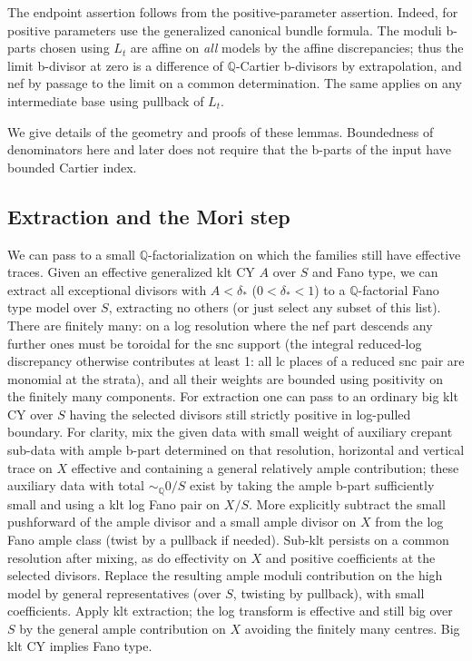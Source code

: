 The endpoint assertion follows from the positive-parameter assertion.
Indeed, for positive parameters use the generalized canonical bundle formula.
The moduli b-parts chosen using \(L_t\) are affine on \emph{all} models by the affine discrepancies; thus the limit b-divisor at zero is a difference of \(\mathbb Q\)-Cartier b-divisors by extrapolation, and nef by passage to the limit on a common determination.
The same applies on any intermediate base using pullback of \(L_t\).

We give details of the geometry and proofs of these lemmas.
Boundedness of denominators here and later does not require that the b-parts of the input have bounded Cartier index.

\subsection{Extraction and the Mori step}\label{subsec:A-mori}
We can pass to a small \(\mathbb Q\)-factorialization on which the
families still have effective traces.
Given an effective generalized klt CY \(A\) over \(S\) and Fano type, we can extract all exceptional divisors with \(A<\delta_*\) (\(0<\delta_*<1\)) to a \(\mathbb Q\)-factorial Fano type model over \(S\), extracting no others (or just select any subset of this list).
There are finitely many: on a log resolution where the nef part descends any further ones must be toroidal for the snc support (the integral reduced-log discrepancy otherwise contributes at least 1: all lc places of a reduced snc pair are monomial at the strata), and all their weights are bounded using positivity on the finitely many components.
For extraction one can pass to an ordinary big klt CY over \(S\) having the selected divisors still strictly positive in log-pulled boundary.
For clarity, mix the given data with small weight of auxiliary crepant sub-data with ample b-part determined on that resolution, horizontal and vertical trace on \(X\) effective and containing a general relatively ample contribution; these auxiliary data with total \(\sim_{\mathbb Q}0/S\) exist by taking the ample b-part sufficiently small and using a klt log Fano pair on \(X/S\).
More explicitly subtract the small pushforward of the ample divisor and a small ample divisor on \(X\) from the log Fano ample class (twist by a pullback if needed).
Sub-klt persists on a common resolution after mixing, as do effectivity on \(X\) and positive coefficients at the selected divisors.
Replace the resulting ample moduli contribution on the high model by general representatives (over \(S\), twisting by pullback), with small coefficients.
Apply klt extraction; the log transform is effective and still big over \(S\) by the general ample contribution on \(X\) avoiding the finitely many centres.
Big klt CY implies Fano type.

